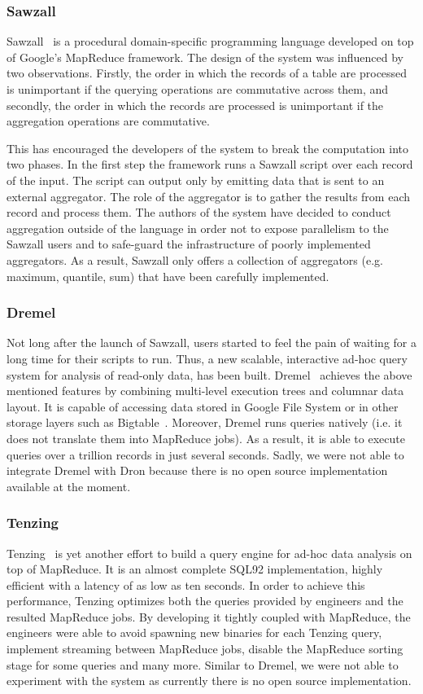 \documentclass[11pt,a4paper,twoside]{report}
\begin{document}
\subsubsection{Sawzall}
Sawzall~\cite{Sawzall} is a procedural domain-specific programming language developed on top of Google's MapReduce framework. The design of the system was influenced by two observations. Firstly, the order in which the records of a table are processed is unimportant if the querying operations are commutative across them, and secondly, the order in which the records are processed is unimportant if the aggregation operations are commutative.


This has encouraged the developers of the system to break the computation into two phases. In the first step the framework runs a Sawzall script over each record of the input. The script can output only by emitting data that is sent to an external aggregator. The role of the aggregator is to gather the results from each record and process them. The authors of the system have decided to conduct aggregation outside of the language in order not to expose parallelism to the Sawzall users and to safe-guard the infrastructure of poorly implemented aggregators. As a result, Sawzall only offers a collection of aggregators (e.g. maximum, quantile, sum) that have been carefully implemented. 

\subsubsection{Dremel}
Not long after the launch of Sawzall, users started to feel the pain of waiting for a long time for their scripts to run. Thus, a new scalable, interactive ad-hoc query system for analysis of read-only data, has been built.
Dremel~\cite{Dremel} achieves the above mentioned features by combining multi-level execution trees and columnar data layout. It is capable of accessing data stored in Google File System or in other storage layers such as Bigtable~\cite{Bigtable}. Moreover, Dremel runs queries natively (i.e. it does not translate them into MapReduce jobs). As a result, it is able to execute queries over a trillion records in just several seconds. Sadly, we were not able to integrate Dremel with Dron because there is no open source implementation available at the moment.

\subsubsection{Tenzing}
Tenzing~\cite{Tenzing} is yet another effort to build a query engine for ad-hoc data analysis on top of MapReduce. It is an almost complete SQL92 implementation, highly efficient with a latency of as low as ten seconds. In order to achieve this performance, Tenzing optimizes both the queries provided by engineers and the resulted MapReduce jobs. By developing it tightly coupled with MapReduce, the engineers were able to avoid spawning new binaries for each Tenzing query, implement streaming between MapReduce jobs, disable the MapReduce sorting stage for some queries and many more. Similar to Dremel, we were not able to experiment with the system as currently there is no open source implementation.
\end{document}
